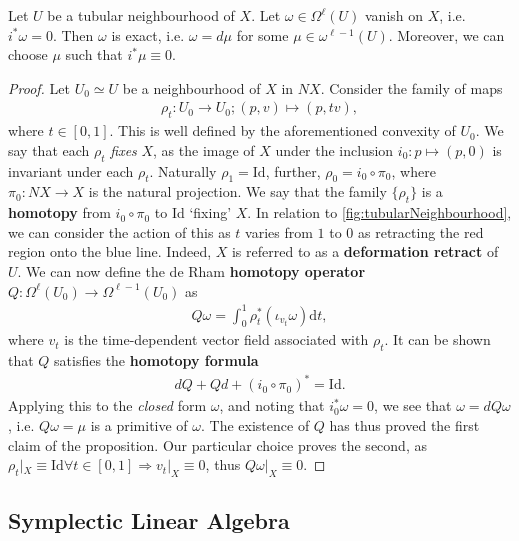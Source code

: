 \documentclass[11pt, final]{article}
\begin{document}
\begin{prop}\label{prop:FuckDeRham}
	Let $U$ be a tubular neighbourhood of $X$. Let $\omega \in \Omega^\ell (U)$ vanish on $X$, i.e. $i^* \omega = 0$. Then $\omega$ is exact, i.e. $\omega = d\mu$ for some $\mu \in \omega^{\ell -1}(U)$. Moreover, we can choose $\mu$ such that $i^* \mu \equiv 0$.
\end{prop}
\begin{proof}
	Let $U_0 \simeq U$ be a neighbourhood of $X$ in $NX$. Consider the family of maps
		\begin{align}
			\rho_t : U_0 \to U_0 ; (p,v) \mapsto (p,tv),
		\end{align}
	where $t \in [0,1]$. This is well defined by the aforementioned convexity of $U_0$. We say that each $\rho_t$ \textit{fixes} $X$, as the image of $X$ under the inclusion $i_0: p \mapsto (p,0)$ is invariant under each $\rho_t$. Naturally $\rho_1 = \mathrm{Id}$, further, $\rho_0 = i_0 \circ \pi_0$, where $\pi_0 : NX \to X$ is the natural projection. We say that the family $\{ \rho_t \}$ is a \textbf{homotopy} from $i_0 \circ \pi_0$ to Id `fixing' $X$. In relation to \autoref{fig:tubularNeighbourhood}, we can consider the action of this as $t$ varies from $1$ to $0$ as retracting the red region onto the blue line. Indeed, $X$ is referred to as a \textbf{deformation retract} of $U$. We can now define the de Rham \textbf{homotopy operator} $Q: \Omega^\ell (U_0) \to \Omega^{\ell -1}(U_0)$ as
		\begin{align}
			Q \omega = \int_0^1 \rho^*_t(\iota_{v_t} \omega ) \mathrm{d}t,
		\end{align}
	where $v_t$ is the time-dependent vector field associated with $\rho_t$. It can be shown that $Q$ satisfies the \textbf{homotopy formula}
		\begin{align}
			dQ + Qd + (i_0 \circ \pi_0)^* = \mathrm{Id} .
		\end{align}
Applying this to the \textit{closed} form $\omega$, and noting that $i_0^* \omega = 0$, we see that $\omega = dQ\omega$, i.e. $Q\omega = \mu$ is a primitive of $\omega$. The existence of $Q$ has thus proved the first claim of the proposition. Our particular choice proves the second, as $\rho_t|_X \equiv \mathrm{Id} \forall t \in [0,1] \Rightarrow v_t|_X \equiv 0$, thus $Q\omega|_X \equiv 0$.
\end{proof}

\subsection{Symplectic Linear Algebra}
\end{document}
